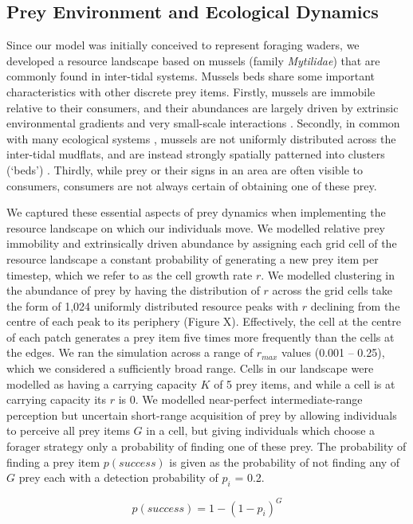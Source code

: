 \documentclass[11pt]{article}
\begin{document}
\subsection{Prey Environment and Ecological Dynamics}

Since our model was initially conceived to represent foraging waders, we developed a resource landscape based on mussels (family \textit{Mytilidae}) that are commonly found in inter-tidal systems.
Mussels beds share some important characteristics with other discrete prey items.
Firstly, mussels are immobile relative to their consumers, and their abundances are largely driven by extrinsic environmental gradients and very small-scale interactions \citep{dejager2020, dejager2011}.
Secondly, in common with many ecological systems \citep{levin1992}, mussels are not uniformly distributed across the inter-tidal mudflats, and are instead strongly spatially patterned into clusters (`beds') \citep{dejager2020, dejager2011}.
Thirdly, while prey or their signs in an area are often visible to consumers, consumers are not always certain of obtaining one of these prey.

We captured these essential aspects of prey dynamics when implementing the resource landscape on which our individuals move.
We modelled relative prey immobility and extrinsically driven abundance by assigning each grid cell of the resource landscape a constant probability of generating a new prey item per timestep, which we refer to as the cell growth rate $r$.
We modelled clustering in the abundance of prey by having the distribution of $r$ across the grid cells take the form of 1,024 uniformly distributed resource peaks with $r$ declining from the centre of each peak to its periphery (Figure X).
Effectively, the cell at the centre of each patch generates a prey item five times more frequently than the cells at the edges.
We ran the simulation across a range of $r_{max}$ values (0.001 -- 0.25), which we considered a sufficiently broad range.
Cells in our landscape were modelled as having a carrying capacity $K$ of 5 prey items, and while a cell is at carrying capacity its $r$ is 0.
We modelled near-perfect intermediate-range perception but uncertain short-range acquisition of prey by allowing individuals to perceive all prey items $G$ in a cell, but giving individuals which choose a forager strategy only a probability of finding one of these prey.
The probability of finding a prey item $p(success)$ is given as the probability of not finding any of $G$ prey each with a detection probability of $p_i$ = 0.2.
\begin{linenomath*}
    \begin{equation}
        p({success}) = 1 - \left(1 - p_i\right) ^ G
    \end{equation}
\end{linenomath*}
\end{document}
